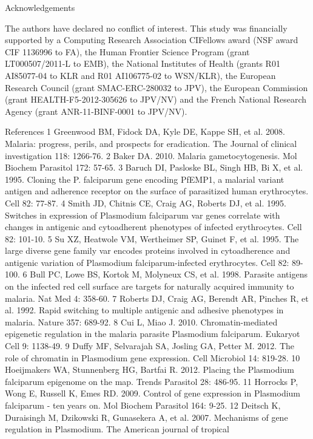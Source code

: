 Acknowledgements

The authors have declared no conflict of interest.
This study was financially supported by a Computing Research Association
CIFellows award (NSF award CIF 1136996 to FA), the Human Frontier Science
Program (grant LT000507/2011-L to EMB), the National Institutes of Health
(grants R01 AI85077-04 to KLR and R01 AI106775-02 to WSN/KLR), the European
Research Council (grant SMAC-ERC-280032 to JPV), the European Commission
(grant HEALTH-F5-2012-305626 to JPV/NV) and the French National Research
Agency (grant ANR-11-BINF-0001 to JPV/NV).

References
1 Greenwood BM, Fidock DA, Kyle DE, Kappe SH, et al. 2008. Malaria: progress,
perils, and prospects for eradication. The Journal of clinical investigation
118: 1266-76.
2 Baker DA. 2010. Malaria gametocytogenesis. Mol Biochem Parasitol 172: 57-65.
3 Baruch DI, Pasloske BL, Singh HB, Bi X, et al. 1995. Cloning the P.
falciparum gene encoding PfEMP1, a malarial variant antigen and adherence
receptor on the surface of parasitized human erythrocytes. Cell 82: 77-87.
4 Smith JD, Chitnis CE, Craig AG, Roberts DJ, et al. 1995. Switches in
expression of Plasmodium falciparum var genes correlate with changes in
antigenic and cytoadherent phenotypes of infected erythrocytes. Cell 82:
101-10.
5 Su XZ, Heatwole VM, Wertheimer SP, Guinet F, et al. 1995. The large diverse
gene family var encodes proteins involved in cytoadherence and antigenic
variation of Plasmodium falciparum-infected erythrocytes. Cell 82: 89-100.
6 Bull PC, Lowe BS, Kortok M, Molyneux CS, et al. 1998. Parasite antigens on
the infected red cell surface are targets for naturally acquired immunity to
malaria. Nat Med 4: 358-60.
7 Roberts DJ, Craig AG, Berendt AR, Pinches R, et al. 1992. Rapid switching to
multiple antigenic and adhesive phenotypes in malaria. Nature 357: 689-92.
8 Cui L, Miao J. 2010. Chromatin-mediated epigenetic regulation in the malaria
parasite Plasmodium falciparum. Eukaryot Cell 9: 1138-49.
9 Duffy MF, Selvarajah SA, Josling GA, Petter M. 2012. The role of chromatin
in Plasmodium gene expression. Cell Microbiol 14: 819-28.
10  Hoeijmakers WA, Stunnenberg HG, Bartfai R. 2012. Placing the Plasmodium
falciparum epigenome on the map. Trends Parasitol 28: 486-95.
11  Horrocks P, Wong E, Russell K, Emes RD. 2009. Control of gene expression
in Plasmodium falciparum - ten years on. Mol Biochem Parasitol 164: 9-25.
12  Deitsch K, Duraisingh M, Dzikowski R, Gunasekera A, et al. 2007.
Mechanisms of gene regulation in Plasmodium. The American journal of tropical
